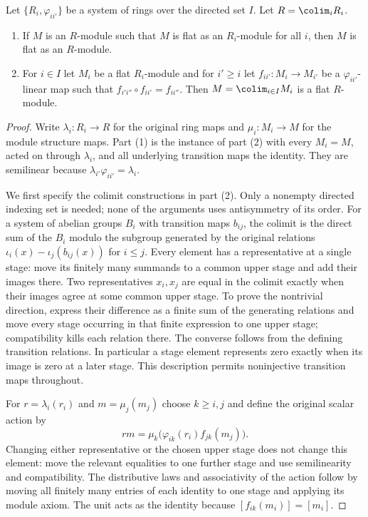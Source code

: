 \begin{lemma}
\label{editorial-source-lemma-colimit-rings-flat}
Let $\{R_i, \varphi_{ii'}\}$ be a system of rings over the directed set $I$.
Let $R = \colim_i R_i$.
\begin{enumerate}
\item If $M$ is an $R$-module such that $M$ is flat as an $R_i$-module
for all $i$, then $M$ is flat as an $R$-module.
\item For $i \in I$ let $M_i$ be a flat $R_i$-module and
for $i' \geq i$ let $f_{ii'} : M_i \to M_{i'}$ be a $\varphi_{ii'}$-linear
map such that $f_{i' i''} \circ f_{i i'} = f_{i i''}$. Then
$M = \colim_{i \in I} M_i$ is a flat $R$-module.
\end{enumerate}
\end{lemma}

\begin{proof}
Write $\lambda_i:R_i\to R$ for the original ring maps and
$\mu_i:M_i\to M$ for the module structure maps. Part (1)
is the instance of part (2) with every $M_i=M$, acted on
through $\lambda_i$, and all underlying transition maps the
identity. They are semilinear because
$\lambda_{i'}\varphi_{ii'}=\lambda_i$.

We first specify the colimit constructions in part (2).
Only a nonempty directed indexing set is needed; none of
the arguments uses antisymmetry of its order. For a system
of abelian groups $B_i$ with transition maps $b_{ij}$,
the colimit is the direct sum of the $B_i$ modulo the
subgroup generated by the original relations
$\iota_i(x)-\iota_j(b_{ij}(x))$ for $i\leq j$.
Every element has a representative at a single stage:
move its finitely many summands to a common upper stage
and add their images there. Two representatives $x_i,x_j$
are equal in the colimit exactly when their images agree
at some common upper stage. To prove the nontrivial
direction, express their difference as a finite sum of
the generating relations and move every stage occurring
in that finite expression to one upper stage; compatibility
kills each relation there. The converse follows from the
defining transition relations. In particular a stage
element represents zero exactly when its image is zero
at a later stage. This description permits noninjective
transition maps throughout.

For $r=\lambda_i(r_i)$ and $m=\mu_j(m_j)$ choose $k\geq i,j$
and define the original scalar action by
$$
rm=\mu_k\bigl(\varphi_{ik}(r_i)f_{jk}(m_j)\bigr).
$$
Changing either representative or the chosen upper stage
does not change this element: move the relevant equalities
to one further stage and use semilinearity and compatibility.
The distributive laws and associativity of the action follow
by moving all finitely many entries of each identity to one
stage and applying its module axiom. The unit acts as the
identity because $[f_{ik}(m_i)]=[m_i]$.


\end{proof}
